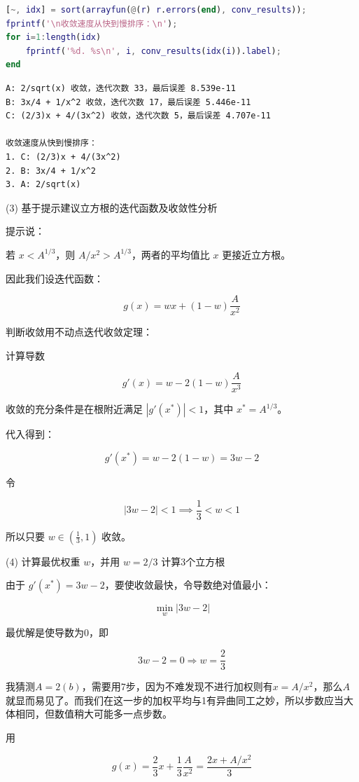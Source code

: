 \begin{enumerate}
\begin{lstlisting}[language=matlab]
% 按收敛速度排序，误差序列最后一项越小，收敛越快
[~, idx] = sort(arrayfun(@(r) r.errors(end), conv_results));
fprintf('\n收敛速度从快到慢排序：\n');
for i=1:length(idx)
    fprintf('%d. %s\n', i, conv_results(idx(i)).label);
end
\end{lstlisting}

\begin{lstlisting}
A: 2/sqrt(x) 收敛，迭代次数 33，最后误差 8.539e-11
B: 3x/4 + 1/x^2 收敛，迭代次数 17，最后误差 5.446e-11
C: (2/3)x + 4/(3x^2) 收敛，迭代次数 5，最后误差 4.707e-11

收敛速度从快到慢排序：
1. C: (2/3)x + 4/(3x^2)
2. B: 3x/4 + 1/x^2
3. A: 2/sqrt(x)
\end{lstlisting}
\end{enumerate}


(3) 基于提示建议立方根的迭代函数及收敛性分析

提示说：

若 $x < A^{1/3}$，则 $A/x^2 > A^{1/3}$，两者的平均值比 $x$ 更接近立方根。

因此我们设迭代函数：

$$
g(x) = w x + (1 - w) \frac{A}{x^2}
$$

判断收敛用不动点迭代收敛定理：

计算导数

$$
g'(x) = w - 2(1-w) \frac{A}{x^3}
$$

收敛的充分条件是在根附近满足 $|g'(x^*)| < 1$，其中 $x^* = A^{1/3}$。

代入得到：

$$
g'(x^*) = w - 2(1-w) = 3w - 2
$$

令

$$
|3w - 2| < 1 \implies \frac{1}{3} < w < 1
$$

所以只要 $w \in (\frac{1}{3}, 1)$ 收敛。

(4) 计算最优权重 $w$，并用 $w=2/3$ 计算3个立方根

由于 $g'(x^*)=3w - 2$，要使收敛最快，令导数绝对值最小：

$$
\min_{w} |3w - 2|
$$

最优解是使导数为0，即

$$
3w - 2 = 0 \Rightarrow w = \frac{2}{3}
$$

我猜测$A=2(b)$，需要用$7$步，因为不难发现不进行加权则有$x=A/x^2$，那么$A$就显而易见了。而我们在这一步的加权平均与1有异曲同工之妙，所以步数应当大体相同，但数值稍大可能多一点步数。

用

$$
g(x) = \frac{2}{3} x + \frac{1}{3} \frac{A}{x^2} = \frac{2x + A/x^2}{3}
$$

